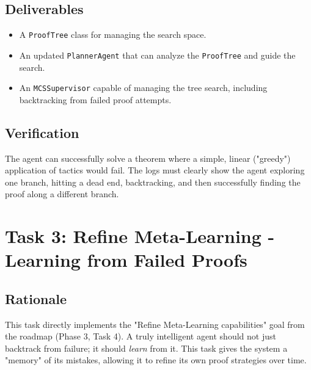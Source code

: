 \documentclass{article}
\begin{document}
\subsection{Deliverables}
\begin{itemize}
    \item A \texttt{ProofTree} class for managing the search space.
    \item An updated \texttt{PlannerAgent} that can analyze the \texttt{ProofTree} and guide the search.
    \item An \texttt{MCSSupervisor} capable of managing the tree search, including backtracking from failed proof attempts.
\end{itemize}

\subsection{Verification}
The agent can successfully solve a theorem where a simple, linear ("greedy") application of tactics would fail. The logs must clearly show the agent exploring one branch, hitting a dead end, backtracking, and then successfully finding the proof along a different branch.

\section{Task 3: Refine Meta-Learning - Learning from Failed Proofs}

\subsection{Rationale}
This task directly implements the "Refine Meta-Learning capabilities" goal from the roadmap (Phase 3, Task 4). A truly intelligent agent should not just backtrack from failure; it should \textit{learn} from it. This task gives the system a "memory" of its mistakes, allowing it to refine its own proof strategies over time.
\end{document}
